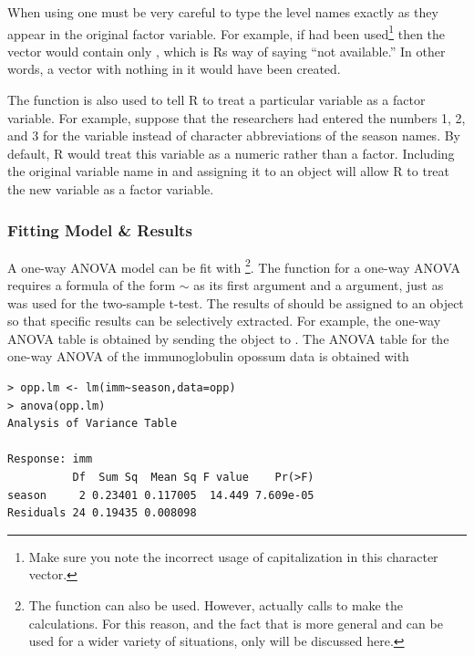 \documentclass[10pt,openany]{book}\usepackage[]{graphicx}\usepackage[]{color}
\makeatletter
\newenvironment{kframe}{%
 \def\at@end@of@kframe{}%
 \ifinner\ifhmode%
  \def\at@end@of@kframe{\end{minipage}}%
  \begin{minipage}{\columnwidth}%
 \fi\fi%
 \def\FrameCommand##1{\hskip\@totalleftmargin \hskip-\fboxsep
 \colorbox{shadecolor}{##1}\hskip-\fboxsep
     \hskip-\linewidth \hskip-\@totalleftmargin \hskip\columnwidth}%
 \MakeFramed {\advance\hsize-\width
   \@totalleftmargin\z@ \linewidth\hsize
   \@setminipage}}%
 {\par\unskip\endMakeFramed%
 \at@end@of@kframe}
\newenvironment{knitrout}{}{} %
\makeatother
\begin{document}
When using  one must be very careful to type the level names exactly as they appear in the original factor variable.  For example, if  had been used\footnote{Make sure you note the incorrect usage of capitalization in this character vector.} then the  vector would contain only , which is Rs way of saying ``not available.''  In other words, a vector with nothing in it would have been created.


The  function is also used to tell R to treat a particular variable as a factor variable.  For example, suppose that the researchers had entered the numbers 1, 2, and 3 for the  variable instead of character abbreviations of the season names.  By default, R would treat this variable as a numeric rather than a factor.  Including the original variable name in  and assigning it to an object will allow R to treat the new variable as a factor variable.


\subsubsection*{Fitting Model \& Results}
A one-way ANOVA model can be fit with \footnote{The  function can also be used.  However,  actually calls  to make the calculations.  For this reason, and the fact that  is more general and can be used for a wider variety of situations, only  will be discussed here.}.  The  function for a one-way ANOVA requires a formula of the form $\sim$ as its first argument and a  argument, just as was used for the two-sample t-test.  The results of  should be assigned to an object so that specific results can be selectively extracted.  For example, the one-way ANOVA table is obtained by sending the  object to .  The ANOVA table for the one-way ANOVA of the immunoglobulin opossum data is obtained with

\begin{knitrout}
\color{fgcolor}\begin{kframe}
\begin{verbatim}
> opp.lm <- lm(imm~season,data=opp)
> anova(opp.lm)
Analysis of Variance Table

Response: imm
          Df  Sum Sq  Mean Sq F value    Pr(>F)
season     2 0.23401 0.117005  14.449 7.609e-05
Residuals 24 0.19435 0.008098                  
\end{verbatim}
\end{kframe}
\end{knitrout}
\end{document}
